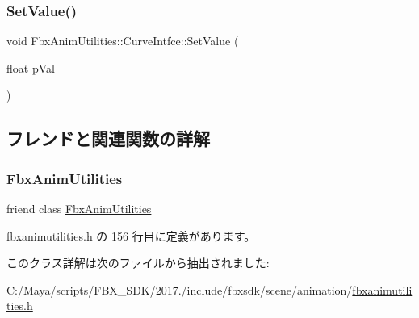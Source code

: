 \subsubsection{\texorpdfstring{Set\+Value()}{SetValue()}}
{\footnotesize\ttfamily void Fbx\+Anim\+Utilities\+::\+Curve\+Intfce\+::\+Set\+Value (\begin{DoxyParamCaption}\item[{float}]{p\+Val }\end{DoxyParamCaption})}



\subsection{フレンドと関連関数の詳解}
\mbox{\label{class_fbx_anim_utilities_1_1_curve_intfce_aeacafd3baeb97bc8863c00bb6de0073d}} 
\subsubsection{\texorpdfstring{Fbx\+Anim\+Utilities}{FbxAnimUtilities}}
{\footnotesize\ttfamily friend class \hyperlink{class_fbx_anim_utilities}{Fbx\+Anim\+Utilities}\hspace{0.3cm}{\ttfamily [friend]}}



 fbxanimutilities.\+h の 156 行目に定義があります。



このクラス詳解は次のファイルから抽出されました\+:\begin{DoxyCompactItemize}
\item 
C\+:/\+Maya/scripts/\+F\+B\+X\+\_\+\+S\+D\+K/2017./include/fbxsdk/scene/animation/\hyperlink{fbxanimutilities_8h}{fbxanimutilities.\+h}\end{DoxyCompactItemize}
